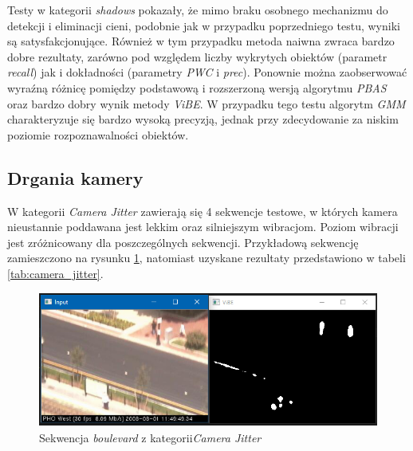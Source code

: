 Testy w kategorii \textit{shadows} pokazały, że mimo braku osobnego mechanizmu do detekcji i eliminacji cieni, podobnie jak w przypadku poprzedniego testu, wyniki są satysfakcjonujące. 
Również w tym przypadku metoda naiwna zwraca bardzo dobre rezultaty, zarówno pod względem liczby wykrytych obiektów (parametr \textit{recall}) jak i dokładności (parametry \textit{PWC} i \textit{prec}). 
Ponownie można zaobserwować wyraźną różnicę pomiędzy podstawową i rozszerzoną wersją algorytmu \textit{PBAS} oraz bardzo dobry wynik metody \textit{ViBE}. 
W przypadku tego testu algorytm \textit{GMM} charakteryzuje się bardzo wysoką precyzją, jednak przy zdecydowanie za niskim poziomie rozpoznawalności obiektów.

\subsection{Drgania kamery}
\label{subsec:drgania_kamery}

W kategorii \textit{Camera Jitter} zawierają się 4 sekwencje testowe, w których kamera nieustannie poddawana jest lekkim oraz silniejszym wibracjom. 
Poziom wibracji jest zróżnicowany dla poszczególnych sekwencji. 
Przykładową sekwencję zamieszczono na rysunku \ref{fig:jitter_example}, natomiast uzyskane rezultaty przedstawiono w tabeli \ref{tab:camera_jitter}. 

    \begin{figure}[h]
			\centering
			\includegraphics[scale=0.8]{img/5/jitter_example.png}
			\caption{Sekwencja \textit{boulevard} z kategorii\textit{Camera Jitter}}
			\label{fig:jitter_example}
	\end{figure}

